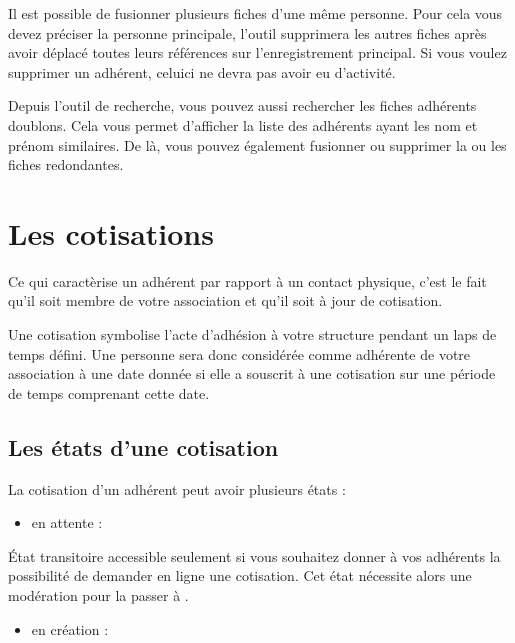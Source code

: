 \documentclass[a4paper,10pt,oneside,french]{sphinxmanual}
\begin{document}
\sphinxAtStartPar
Il est possible de fusionner plusieurs fiches d’une même personne.
Pour cela vous devez préciser la personne principale, l’outil supprimera les autres fiches après avoir déplacé toutes leurs références sur l’enregistrement principal.
Si vous voulez supprimer un adhérent, celui\sphinxhyphen{}ci ne devra pas avoir eu d’activité.

\sphinxAtStartPar
Depuis l’outil de recherche, vous pouvez aussi rechercher les fiches adhérents doublons. Cela vous permet d’afficher la liste des adhérents ayant les nom et prénom similaires.
De là, vous pouvez également fusionner ou supprimer la ou les fiches redondantes.


\section{Les cotisations}
\label{\detokenize{member/subscription:les-cotisations}}\label{\detokenize{member/subscription::doc}}
\sphinxAtStartPar
Ce qui caractèrise un adhérent par rapport à un contact physique, c’est le fait qu’il soit membre de votre association et qu’il soit à jour de cotisation.

\sphinxAtStartPar
Une cotisation symbolise l’acte d’adhésion à votre structure pendant un laps de temps défini.
Une personne sera donc considérée comme adhérente de votre association à une date donnée si elle a souscrit à une cotisation sur une période de temps comprenant cette date.


\subsection{Les états d’une cotisation}
\label{\detokenize{member/subscription:les-etats-d-une-cotisation}}
\sphinxAtStartPar
La cotisation d’un adhérent peut avoir plusieurs états :
\begin{itemize}
\item {} 
\sphinxAtStartPar
en attente :

\end{itemize}

\sphinxAtStartPar
État transitoire accessible seulement si vous souhaitez donner à vos adhérents la possibilité de demander en ligne une cotisation.
Cet état nécessite alors une modération pour la passer à .
\begin{itemize}
\item {} 
\sphinxAtStartPar
en création :

\end{itemize}
\end{document}
